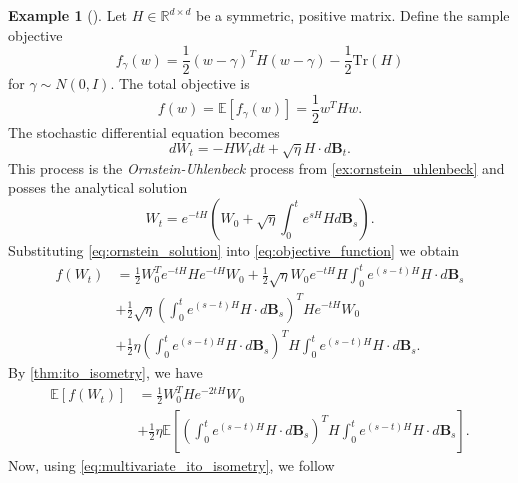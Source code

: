 \documentclass[12pt]{article}
\theoremstyle{definition}
\newtheorem{example}[example]{Example}
\numberwithin{equation}{section}
\newcommand{\ev}[1]{\mathbb{E}\left[{#1}\right]}
\begin{document}
\begin{example}[\autocite{liStochasticModifiedEquations2019}]
  \label{ex:quadratic_smde}
  Let $H \in \mathbb{R}^{d\times d}$ be a symmetric, positive matrix. Define the sample objective 
\begin{equation*}
  f_{\gamma}(w) = \frac{1}{2} (w - \gamma)^T H (w - \gamma) - \frac{1}{2} \text{Tr}(H)
\end{equation*}
for $\gamma \sim N(0,I)$. The total objective is 
\begin{equation*}
  \label{eq:objective_function}
  f(w) = \ev{f_{\gamma}(w)} = \frac{1}{2} w^T H w.
\end{equation*}
The stochastic differential equation becomes 
\begin{equation*}
  dW_t = -H W_t dt + \sqrt{\eta}H \cdot d\pmb{B}_t.
\end{equation*}
This process is the \emph{Ornstein-Uhlenbeck} process from \autoref{ex:ornstein_uhlenbeck} and posses the analytical solution
\begin{equation}
  \label{eq:ornstein_solution}
  W_t = e^{-t H}\left(W_0 + \sqrt{\eta}\int_0^te^{s H}H d\pmb{B}_s\right).
\end{equation}
Substituting \eqref{eq:ornstein_solution} into \eqref{eq:objective_function} we obtain
\begin{equation*}
  \begin{split}
    f(W_t) &= \frac{1}{2} W_0^Te^{-tH}He^{-tH}W_0 +
     \frac{1}{2} \sqrt{\eta}W_0e^{-tH}H\int_0^t e^{(s-t)H}H\cdot d\pmb{B}_s \\ 
    &+ \frac{1}{2} \sqrt{\eta}\left(\int_0^t e^{(s-t)H}H\cdot d\pmb{B}_s\right)^T He^{-tH}W_0 \\
    &+ \frac{1}{2} \eta \left(\int_0^t e^{(s-t)H}H\cdot d\pmb{B}_s\right)^T H\int_0^t e^{(s-t)H}H\cdot d\pmb{B}_s.
  \end{split}
\end{equation*}
By \autoref{thm:ito_isometry}, we have 
\begin{equation*}
  \begin{split}
  \ev{f(W_t)} &= \frac{1}{2}W_0^THe^{-2tH}W_0 \\
  &+ \frac{1}{2} \eta \ev{ \left(\int_0^t e^{(s-t)H}H\cdot d\pmb{B}_s\right)^T H\int_0^t e^{(s-t)H}H\cdot d\pmb{B}_s}.
  \end{split}
\end{equation*}
Now, using \eqref{eq:multivariate_ito_isometry}, we follow
\begin{equation}
  \begin{split}

\end{split}
\end{equation}
\end{example}
\end{document}
